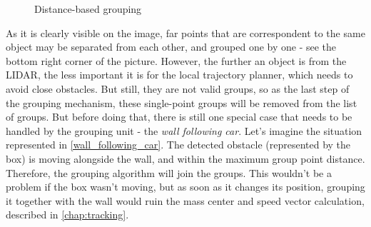 \begin{figure}[!ht]
    \centering
    \caption{Distance-based grouping}
    \label{wall_following_car}
\end{figure}

As it is clearly visible on the image, far points that are correspondent to the same object may be separated from each other, and grouped one by one - see the bottom right corner of the picture. However, the further an object is from the LIDAR, the less important it is for the local trajectory planner, which needs to avoid close obstacles. But still, they are not valid groups, so as the last step of the grouping mechanism, these single-point groups will be removed from the list of groups. But before doing that, there is still one special case that needs to be handled by the grouping unit - the \textit{wall following car}. Let's imagine the situation represented in \autoref{wall_following_car}. The detected obstacle (represented by the box) is moving alongside the wall, and within the maximum group point distance. Therefore, the grouping algorithm will join the groups. This wouldn't be a problem if the box wasn't moving, but as soon as it changes its position, grouping it together with the wall would ruin the mass center and speed vector calculation, described in \autoref{chap:tracking}.

